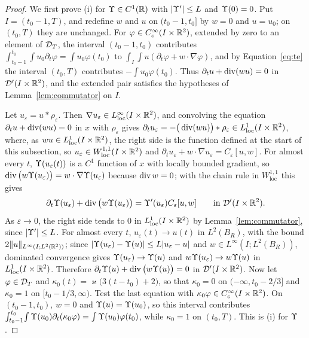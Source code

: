 \begin{proof}
We first prove (i) for $\Upsilon\in C^1(\mathbb{R})$ with $|\Upsilon'|\le L$ and $\Upsilon(0)=0$.
Put $I=(t_0-1,T)$, and redefine $w$ and $u$ on $(t_0-1,t_0]$ by $w=0$ and
$u=u_0$; on $(t_0,T)$ they are unchanged. For $\varphi\in C_c^\infty(I\times\mathbb{R}^2)$, extended by zero to an
element of $\mathcal{D}_T$, the interval $(t_0-1,t_0)$ contributes
$\int_{t_0-1}^{t_0}\!\int u_0\partial_t\varphi=\int u_0\varphi(t_0)$ to
$\int_I\!\int u(\partial_t\varphi+w\cdot\nabla\varphi)$, and by
Equation~\eqref{eq:te} the interval $(t_0,T)$ contributes
$-\int u_0\varphi(t_0)$. Thus $\partial_tu+\operatorname{div}(wu)=0$ in
$\mathcal D'(I\times\mathbb{R}^2)$, and the extended pair satisfies the hypotheses of
Lemma~\ref{lem:commutator} on $I$.

Let $u_\varepsilon=u\ast\rho_\varepsilon$. Then $\nabla u_\varepsilon\in
L^\infty_{\mathrm{loc}}(I\times\mathbb{R}^2)$, and convolving the equation
$\partial_tu+\operatorname{div}(wu)=0$ in $x$ with $\rho_\varepsilon$ gives
$\partial_tu_\varepsilon=-\big(\operatorname{div}(wu)\big)\ast\rho_\varepsilon\in L^1_{\mathrm{loc}}(I\times\mathbb{R}^2)$, where,
as $wu\in L^1_{\mathrm{loc}}(I\times\mathbb{R}^2)$, the right side is the function defined at the
start of this subsection,
so $u_\varepsilon\in W^{1,1}_{\mathrm{loc}}(I\times\mathbb{R}^2)$ and
$\partial_tu_\varepsilon+w\cdot\nabla u_\varepsilon=C_\varepsilon[u,w]$. For
almost every $t$, $\Upsilon(u_\varepsilon(t))$ is a $C^1$ function of $x$ with
locally bounded gradient, so
$\operatorname{div}\big(w\Upsilon(u_\varepsilon)\big)=w\cdot\nabla\Upsilon(u_\varepsilon)$ because
$\operatorname{div} w=0$; with the chain rule in $W^{1,1}_{\mathrm{loc}}$ this gives
\[
\partial_t\Upsilon(u_\varepsilon)+\operatorname{div}\big(w\Upsilon(u_\varepsilon)\big)=\Upsilon'(u_\varepsilon)C_\varepsilon[u,w]
\qquad\text{in }\mathcal D'(I\times\mathbb{R}^2).
\]
As $\varepsilon\to0$, the right side tends to $0$ in $L^1_{\mathrm{loc}}(I\times\mathbb{R}^2)$ by
Lemma~\ref{lem:commutator}, since $|\Upsilon'|\le L$. For almost every $t$, $u_\varepsilon(t)\to u(t)$ in
$L^2(B_R)$, with the bound $2\|u\|_{L^\infty(I;L^2(\mathbb{R}^2))}$; since
$|\Upsilon(u_\varepsilon)-\Upsilon(u)|\le L|u_\varepsilon-u|$ and
$w\in L^\infty(I;L^2(B_R))$, dominated convergence gives
$\Upsilon(u_\varepsilon)\to\Upsilon(u)$ and $w\Upsilon(u_\varepsilon)\to w\Upsilon(u)$ in
$L^1_{\mathrm{loc}}(I\times\mathbb{R}^2)$. Therefore $\partial_t\Upsilon(u)+\operatorname{div}\big(w\Upsilon(u)\big)=0$
in $\mathcal D'(I\times\mathbb{R}^2)$. Now let $\varphi\in\mathcal{D}_T$ and
$\kappa_0(t)=\varkappa\big(3(t-t_0)+2\big)$, so that $\kappa_0=0$ on
$(-\infty,t_0-2/3]$ and $\kappa_0=1$ on $[t_0-1/3,\infty)$. Test the last
equation with $\kappa_0\varphi\in C_c^\infty(I\times\mathbb{R}^2)$. On $(t_0-1,t_0)$,
$w=0$ and $\Upsilon(u)=\Upsilon(u_0)$, so this interval contributes
$\int_{t_0-1}^{t_0}\!\int\Upsilon(u_0)\partial_t(\kappa_0\varphi)=\int\Upsilon(u_0)\varphi(t_0)$,
while $\kappa_0=1$ on $(t_0,T)$. This is (i) for $\Upsilon$.


\end{proof}
